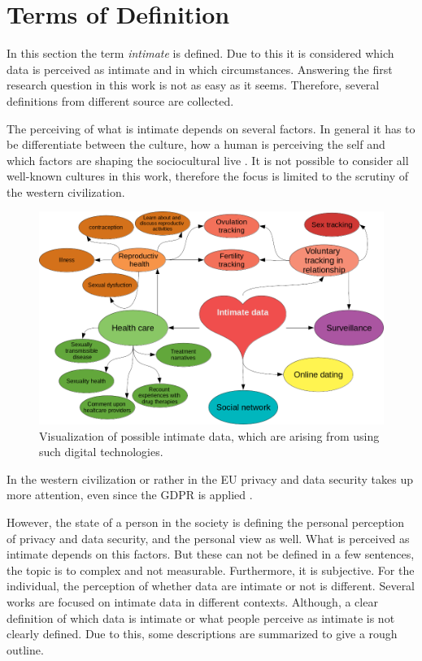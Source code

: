 \section{Terms of Definition}
\label{sec:terms_of_definition}
In this section the term \textit{intimate} is defined. Due to this it is considered which data is perceived as intimate and in which circumstances.
Answering the first research question in this work is not as easy as it seems. Therefore, several definitions from different source are collected.

The perceiving of what is intimate depends on several factors.
In general it has to be differentiate between the culture, how a human is perceiving the self and which factors are shaping the sociocultural live \cite{carrithers1985category}. It is not possible to consider all well-known cultures in this work, therefore the focus is limited to the scrutiny of the western civilization. 
\begin{figure}[htb]
	\centering
	\includegraphics[width=\linewidth]{img/cluster_heart.png}
	\caption{Visualization of possible intimate data, which are arising from using such digital technologies.}
	\label{fig:cluster}
\end{figure}
In the western civilization or rather in the \ac{EU} privacy and data security takes up more attention, even since the \ac{GDPR} is applied \cite{albrecht2016gdpr}.

However, the state of a person in the society is defining the personal perception of privacy and data security, and the personal view as well. What is perceived as intimate depends on this factors.
But these can not be defined in a few sentences, the topic is to complex and not measurable. Furthermore, it is subjective. For the individual, the perception of whether data are intimate or not is different. 
Several works are focused on intimate data in different contexts. Although, a clear definition of which data is intimate or what people perceive as intimate is not clearly defined. Due to this, some descriptions are summarized to give a rough outline.

